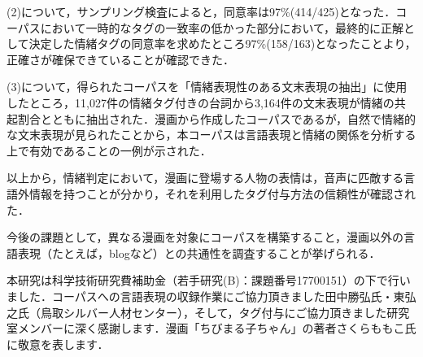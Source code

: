 \documentclass[japanese]{jnlp_1.3c}
\begin{document}
(2)について，サンプリング検査によると，同意率は97\%(414/425)となった．コーパスにおいて一時的なタグの一致率の低かった部分において，最終的に正解として決定した情緒タグの同意率を求めたところ97\%(158/163)となったことより，正確さが確保できていることが確認できた．

(3)について，得られたコーパスを「情緒表現性のある文末表現の抽出」に使用したところ，11,027件の情緒タグ付きの台詞から3,164件の文末表現が情緒の共起割合とともに抽出された．漫画から作成したコーパスであるが，自然で情緒的な文末表現が見られたことから，本コーパスは言語表現と情緒の関係を分析する上で有効であることの一例が示された．

以上から，情緒判定において，漫画に登場する人物の表情は，音声に匹敵する言語外情報を持つことが分かり，それを利用したタグ付与方法の信頼性が確認された．

今後の課題として，異なる漫画を対象にコーパスを構築すること，漫画以外の言語表現（たとえば，blogなど）との共通性を調査することが挙げられる．

\acknowledgment

本研究は科学技術研究費補助金（若手研究(B)：課題番号17700151）の下で行いました．コーパスへの言語表現の収録作業にご協力頂きました田中勝弘氏・東弘之氏（鳥取シルバー人材センター），そして，タグ付与にご協力頂きました研究室メンバーに深く感謝します．漫画「ちびまる子ちゃん」の著者さくらももこ氏に敬意を表します．
\end{document}
